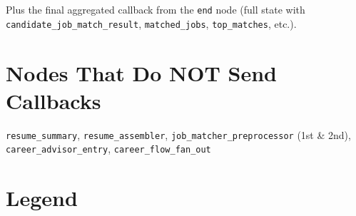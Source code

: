 \documentclass[11pt,a4paper]{article}
\begin{document}
\vspace{1em}
Plus the final aggregated callback from the \texttt{end} node (full state with \texttt{candidate\_job\_match\_result}, \texttt{matched\_jobs}, \texttt{top\_matches}, etc.).

\vspace{1em}

\section*{Nodes That Do NOT Send Callbacks}

\texttt{resume\_summary}, \texttt{resume\_assembler}, \texttt{job\_matcher\_preprocessor} (1st \& 2nd), \texttt{career\_advisor\_entry}, \texttt{career\_flow\_fan\_out}

\vspace{1em}

\section*{Legend}

\end{document}
